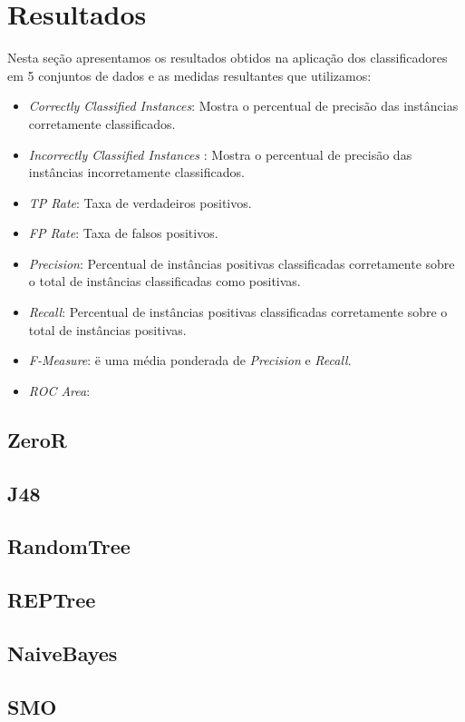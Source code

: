 \documentclass[
	12pt,				%
	openright,			%
	oneside,	
	a4paper,				%
	english,				%
	brazil				%
]{abntex2/abntex2} %
\begin{document}
	\section{Resultados}
	
	Nesta seção apresentamos os resultados obtidos na aplicação dos classificadores em  5  conjuntos de dados e as medidas resultantes que utilizamos:
	\begin{itemize}
		\item \textit{Correctly Classified Instances}: Mostra o percentual de precisão das instâncias corretamente classificados.
		\item \textit{Incorrectly Classified Instances} : Mostra o percentual de precisão das instâncias incorretamente classificados.
		\item \textit{TP Rate}: Taxa de verdadeiros positivos.
		\item \textit{FP Rate}: Taxa de falsos positivos.
		\item \textit{Precision}: Percentual de instâncias positivas classificadas corretamente sobre o total de instâncias classificadas como positivas.
		\item \textit{Recall}: Percentual de instâncias positivas classificadas corretamente sobre o total de instâncias positivas.
		\item \textit{F-Measure}: ë uma média ponderada de \textit{Precision} e \textit{Recall}.
		\item \textit{ROC Area}: 
	\end{itemize}
	
		\subsection{ZeroR}
		\subsection{J48}
		\subsection{RandomTree}
		\subsection{REPTree}
		\subsection{NaiveBayes}
		\subsection{SMO}
		
\end{document}
